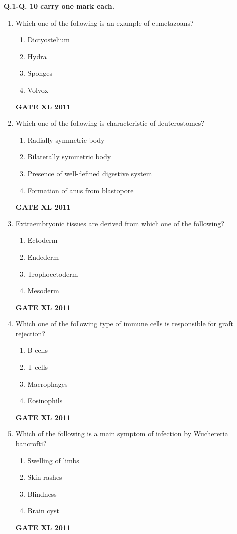 \documentclass[journal,12pt,onecolumn]{IEEEtran}
\begin{document}
\textbf{Q.1-Q. 10 carry one mark each.}

\begin{enumerate}
	\item{ Which one of the following is an example of eumetazoans?}
		\begin{enumerate}
			\item Dictyostelium
			\item Hydra
			\item Sponges
			\item Volvox
		\end{enumerate}
		\hfill{\textbf{GATE XL 2011}}
		
	\item {Which one of the following is characteristic of deuterostomes?}

		\begin{enumerate}
			\item Radially symmetric body
			\item Bilaterally symmetric body
			\item Presence of well-defined digestive system
			\item Formation of anus from blastopore
		\end{enumerate}
		\hfill{\textbf{GATE XL 2011}}

	\item{ Extraembryonic tissues are derived from which one of the following?}
		\begin{enumerate}
			\item Ectoderm
			\item Endederm
			\item Trophocctoderm
			\item Mesoderm
		\end{enumerate}
		\hfill{\textbf{GATE XL 2011}}
		
	\item{ Which one of the following type of immune cells is responsible for graft rejection?}

		\begin{enumerate}
			\item B cells
			\item T cells
			\item Macrophages
			\item Eosinophils
		\end{enumerate}
		\hfill{\textbf{GATE XL 2011}}
		
	\item{ Which of the following is a main symptom of infection by Wuchereria bancrofti?}
		\begin{enumerate}
			\item Swelling of limbs
			\item Skin rashes
			\item Blindness
			\item Brain cyst
		\end{enumerate}
		\hfill{\textbf{GATE XL 2011}}
		

\end{enumerate}
\end{document}
